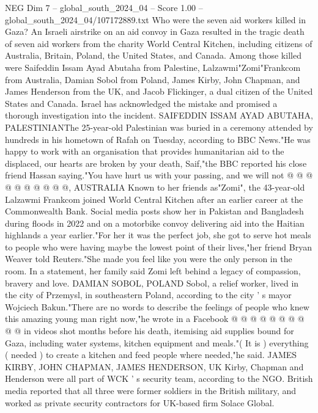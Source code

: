 \begin{textsample}{NEG Dim 7 – global\_south\_2024\_04 – Score 1.00 – global\_south\_2024\_04/107172889.txt}  \label{ex:f7_neg_289}
Who were the seven aid workers killed in Gaza?
An Israeli airstrike on an aid convoy in Gaza resulted in the tragic death of seven aid workers from the charity World Central Kitchen, including citizens of Australia, Britain, Poland, the United States, and Canada.
Among those killed were Saifeddin Issam Ayad Abutaha from Palestine, Lalzawmi"Zomi"Frankcom from Australia, Damian Sobol from Poland, James Kirby, John Chapman, and James Henderson from the UK, and Jacob Flickinger, a dual citizen of the United States and Canada.
Israel has acknowledged the mistake and promised a thorough investigation into the incident.
SAIFEDDIN ISSAM AYAD ABUTAHA, PALESTINIANThe 25-year-old Palestinian was buried in a ceremony attended by hundreds in his hometown of Rafah on Tuesday, according to BBC News."He was happy to work with an organisation that provides humanitarian aid to the displaced, our hearts are broken by your death, Saif,"the BBC reported his close friend Hassan saying."You have hurt us with your passing, and we will not @ @ @ @ @ @ @ @ @ @, AUSTRALIA Known to her friends as"Zomi", the 43-year-old Lalzawmi Frankcom joined World Central Kitchen after an earlier career at the Commonwealth Bank.
Social media posts show her in Pakistan and Bangladesh during floods in 2022 and on a motorbike convoy delivering aid into the Haitian highlands a year earlier."For her it was the perfect job, she got to serve hot meals to people who were having maybe the lowest point of their lives,"her friend Bryan Weaver told Reuters."She made you feel like you were the only person in the room.
In a statement, her family said Zomi left behind a legacy of compassion, bravery and love.
DAMIAN SOBOL, POLAND Sobol, a relief worker, lived in the city of Przemysl, in southeastern Poland, according to the city ' s mayor Wojciech Bakun."There are no words to describe the feelings of people who knew this amazing young man right now,"he wrote in a Facebook @ @ @ @ @ @ @ @ @ @ in videos shot months before his death, itemising aid supplies bound for Gaza, including water systems, kitchen equipment and meals."( It is ) everything ( needed ) to create a kitchen and feed people where needed,"he said.
JAMES KIRBY, JOHN CHAPMAN, JAMES HENDERSON, UK Kirby, Chapman and Henderson were all part of WCK ' s security team, according to the NGO.
British media reported that all three were former soldiers in the British military, and worked as private security contractors for UK-based firm Solace Global.

\end{textsample}
